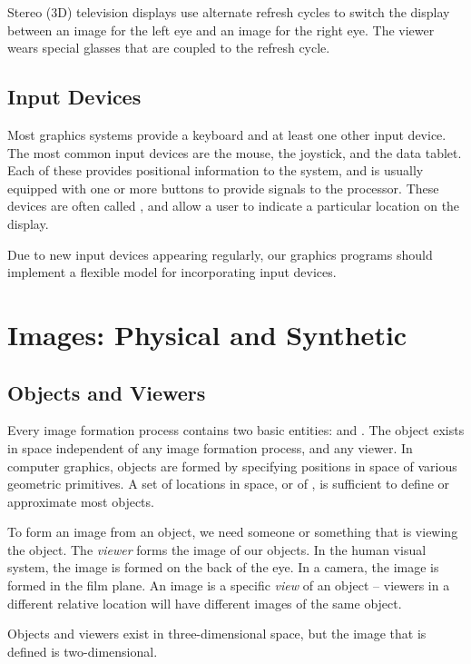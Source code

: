 \documentclass[\main/notes.tex]{subfiles}
\begin{document}
				Stereo (3D) television displays use alternate refresh cycles to switch the display
				between an image for the left eye and an image for the right eye.
				The viewer wears special glasses that are coupled to the refresh cycle.

			\subsection{Input Devices}
				Most graphics systems provide a keyboard and at least one other input device.
				The most common input devices are the mouse, the joystick, and the data tablet.
				Each of these provides positional information to the system,
				and is usually equipped with one or more buttons to provide signals to the processor.
				These devices are often called ,
				and allow a user to indicate a particular location on the display.

				Due to new input devices appearing regularly,
				our graphics programs should implement a flexible model for incorporating input devices.
			\pagebreak

		\section{Images: Physical and Synthetic}
			\subsection{Objects and Viewers}
				Every image formation process contains two basic entities:
				 and .
				The object exists in space independent of any image formation process, and any viewer.
				In computer graphics, objects are formed by specifying positions in space of various
				geometric primitives.
				A set of locations in space, or of , is sufficient to define or
				approximate most objects.

				To form an image from an object, we need someone or something that is viewing the object.
				The \emph{viewer} forms the image of our objects.
				In the human visual system, the image is formed on the back of the eye.
				In a camera, the image is formed in the film plane.
				An image is a specific \emph{view} of an object -- viewers in a different relative
				location will have different images of the same object.

				Objects and viewers exist in three-dimensional space,
				but the image that is defined is two-dimensional.
\end{document}
